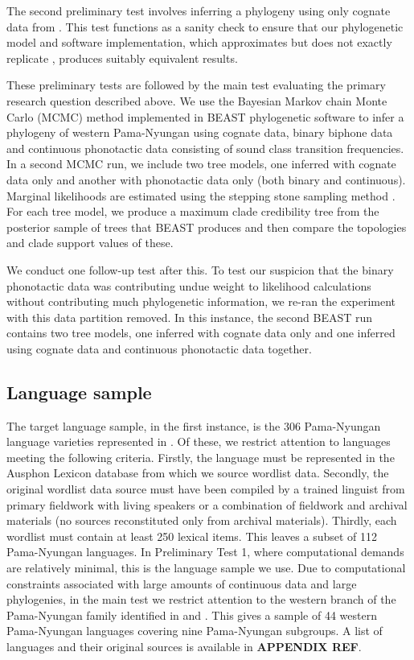 \documentclass[]{article}
\begin{document}
The second preliminary test involves inferring a phylogeny using only cognate data from \textcite{bouckaert_origin_2018}. This test functions as a sanity check to ensure that our phylogenetic model and software implementation, which approximates but does not exactly replicate \textcite{bouckaert_origin_2018}, produces suitably equivalent results.

These preliminary tests are followed by the main test evaluating the primary research question described above. We use the Bayesian Markov chain Monte Carlo (MCMC) method implemented in BEAST phylogenetic software to infer a phylogeny of western Pama-Nyungan using cognate data, binary biphone data and continuous phonotactic data consisting of sound class transition frequencies. In a second MCMC run, we include two tree models, one inferred with cognate data only and another with phonotactic data only (both binary and continuous). Marginal likelihoods are estimated using the stepping stone sampling method \autocite{baele_accurate_2013}. For each tree model, we produce a maximum clade credibility tree from the posterior sample of trees that BEAST produces and then compare the topologies and clade support values of these.

We conduct one follow-up test after this. To test our suspicion that the binary phonotactic data was contributing undue weight to likelihood calculations without contributing much phylogenetic information, we re-ran the experiment with this data partition removed. In this instance, the second BEAST run contains two tree models, one inferred with cognate data only and one inferred using cognate data and continuous phonotactic data together.

\hypertarget{language-sample}{%
\subsection{Language sample}\label{language-sample}}

The target language sample, in the first instance, is the 306 Pama-Nyungan language varieties represented in \textcite{bouckaert_origin_2018}. Of these, we restrict attention to languages meeting the following criteria. Firstly, the language must be represented in the Ausphon Lexicon database \autocite[@][]{round_ausphon-lexicon_2017} from which we source wordlist data. Secondly, the original wordlist data source must have been compiled by a trained linguist from primary fieldwork with living speakers or a combination of fieldwork and archival materials (no sources reconstituted only from archival materials). Thirdly, each wordlist must contain at least 250 lexical items. This leaves a subset of 112 Pama-Nyungan languages. In Preliminary Test 1, where computational demands are relatively minimal, this is the language sample we use. Due to computational constraints associated with large amounts of continuous data and large phylogenies, in the main test we restrict attention to the western branch of the Pama-Nyungan family identified in \textcite{bowern_computational_2012} and \textcite{bouckaert_origin_2018}. This gives a sample of 44 western Pama-Nyungan languages covering nine Pama-Nyungan subgroups. A list of languages and their original sources is available in \textbf{APPENDIX REF}.
\end{document}
